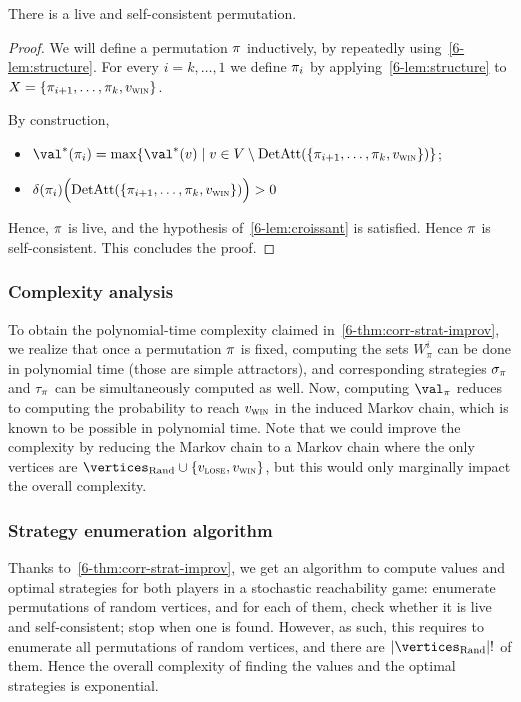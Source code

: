 \begin{lemma}
\label{stoch:lemma-existence}
There is a live and self-consistent permutation.
\end{lemma}

\begin{proof}
We will define a permutation $\pi$ inductively, by repeatedly using~\cref{6-lem:structure}.
For every $i =k, \ldots ,1$ we define $\pi_i$ by applying~\cref{6-lem:structure} to 
$X = \{\pi_{i+1},\ldots,\pi_k,v_{\textsc{win}}\}$.

By construction,
\begin{itemize}
\item $\val^*(\perm_i) = \max \{\val^*(v) \mid v \in V \setminus
\DetAtt(\{\perm_{i+1},\ldots,\perm_k,\vwin\})\}$;
\item $\delta(\pi_i)\Big(\textrm{DetAtt}(\{\pi_{i+1},\ldots,\pi_k,v_{\textsc{win}}\})\Big) >0$
\end{itemize}
Hence, $\pi$ is live, and the hypothesis of~\cref{6-lem:croissant} is satisfied. Hence $\pi$ is
self-consistent. This concludes the proof.
\end{proof}

\subsubsection{Complexity analysis}

To obtain the polynomial-time complexity claimed in~\cref{6-thm:corr-strat-improv}, 
we realize that once a permutation $\pi$ is fixed, computing the sets $W_\pi^i$ can be done
in polynomial time (those are simple attractors), and corresponding
strategies $\sigma_\pi$ and $\tau_\pi$ can be simultaneously
computed as well. Now, computing $\val_\perm$ reduces to computing the
probability to reach $v_{\textsc{win}}$ in the induced Markov chain, which is
known to be possible in polynomial time. Note that we could improve
the complexity by reducing the Markov chain to a Markov chain where
the only vertices are $\Randomvertices \cup \{\vlose,\vwin\}$, but
this would only marginally impact the overall complexity.

\subsubsection{Strategy enumeration algorithm}
\label{6-subsec:last}

Thanks to~\cref{6-thm:corr-strat-improv}, we get an algorithm
to compute values and optimal strategies for both players in a
stochastic reachability game: enumerate permutations of random
vertices, and for each of them, check whether it is live and
self-consistent; stop when one is found.
%
However, as such, this requires to enumerate all permutations of
random vertices, and there are $|\Randomvertices|!$ of them. Hence the
overall complexity of finding the values and the optimal strategies is
exponential.



